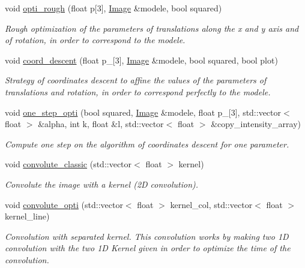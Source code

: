\begin{DoxyCompactItemize}
void \hyperlink{class_image_a9a9dc134dea9ed94a2f0717bbbdc203d}{opti\+\_\+rough} (float p\mbox{[}3\mbox{]}, \hyperlink{class_image}{Image} \&modele, bool squared)
\begin{DoxyCompactList}\small\item\em Rough optimization of the parameters of translations along the x and y axis and of rotation, in order to correspond to the modele. \end{DoxyCompactList}\item 
void \hyperlink{class_image_aafaf002c76afadb1241bb3b2bca8b097}{coord\+\_\+descent} (float p\+\_\mbox{[}3\mbox{]}, \hyperlink{class_image}{Image} \&modele, bool squared, bool plot)
\begin{DoxyCompactList}\small\item\em Strategy of coordinates descent to affine the values of the parameters of translations and rotation, in order to correspond perfectly to the modele. \end{DoxyCompactList}\item 
void \hyperlink{class_image_ac12c55408bf0f10d274fc109484b65d2}{one\+\_\+step\+\_\+opti} (bool squared, \hyperlink{class_image}{Image} \&modele, float p\+\_\mbox{[}3\mbox{]}, std\+::vector$<$ float $>$ \&alpha, int k, float \&l, std\+::vector$<$ float $>$ \&copy\+\_\+intensity\+\_\+array)
\begin{DoxyCompactList}\small\item\em Compute one step on the algorithm of coordinates descent for one parameter. \end{DoxyCompactList}\item 
void \hyperlink{class_image_a470150ab0e07a2edd2bd15523ec72543}{convolute\+\_\+classic} (std\+::vector$<$ float $>$ kernel)
\begin{DoxyCompactList}\small\item\em Convolute the image with a kernel (2D convolution). \end{DoxyCompactList}\item 
void \hyperlink{class_image_ada95b6ea97ecf58ef3d0e2d7e6c3c8e2}{convolute\+\_\+opti} (std\+::vector$<$ float $>$ kernel\+\_\+col, std\+::vector$<$ float $>$ kernel\+\_\+line)
\begin{DoxyCompactList}\small\item\em Convolution with separated kernel. This convolution works by making two 1D convolution with the two 1D Kernel given in order to optimize the time of the convolution. \end{DoxyCompactList}\item 

\end{DoxyCompactItemize}
